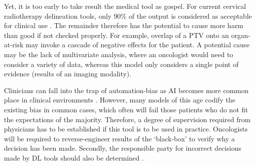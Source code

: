 \documentclass[11pt,twoside]{report}
\begin{document}
Yet, it is too early to take result the medical tool as gospel. For current cervical radiotherapy delineation tools, only 90\% of the output is considered as acceptable for clinical use \cite{auto-delineation-cervical-cancer-development}. The remainder therefore has the potential to cause more harm than good if not checked properly. For example, overlap of a PTV onto an organ-at-risk may invoke a cascade of negative effects for the patient. A potential cause may be the lack of multivariate analysis, where an oncologist would need to consider a variety of data, whereas this model only considers a single point of evidence (results of an imaging modality).

Clinicians can fall into the trap of automation-bias as AI becomes more common place in clinical environments \cite{automation-bias}. However, many models of this age codify the existing bias in common cases, which often will fail those patients who do not fit the expectations of the majority. Therefore, a degree of supervision required from physicians has to be established if this tool is to be used in practice. Oncologists will be required to reverse-engineer results of the `black-box' to verify why a decision has been made. Secondly, the responsible party for incorrect decisions made by DL tools should also be determined \cite{AI-in-cancer-diagnosis-era}.

\printbibliography
{}
\end{document}
